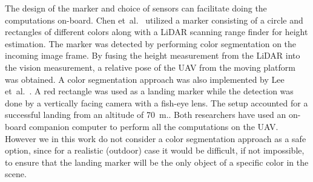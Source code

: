 \documentclass[conference]{IEEEtran}
\begin{document}




The design of the marker and choice of sensors can facilitate doing the computations on-board. %
%
Chen et~al.~\cite{chen2016system} utilized a marker consisting of a
circle and rectangles of different colors along with a LiDAR scanning
range finder for height estimation. The marker was detected by
performing color segmentation on the incoming image frame. By fusing
the height measurement from the LiDAR into the vision measurement, a
relative pose of the UAV from the moving platform was obtained. A
color segmentation approach was also implemented by Lee
et~al.~\cite{lee2016vision}. A red rectangle was used as a landing marker while the detection was done by a vertically facing camera with a fish-eye lens. The setup accounted for a successful landing from an altitude of \SI{70}{\m}.. Both researchers have used an on-board companion computer to
perform all the computations on the UAV. However we in this work do not consider a color segmentation
approach as a safe option, since for a realistic (outdoor)
case it would be difficult, if not impossible, to ensure that the
landing marker will be the only object of a specific color in the
scene.

\end{document}
